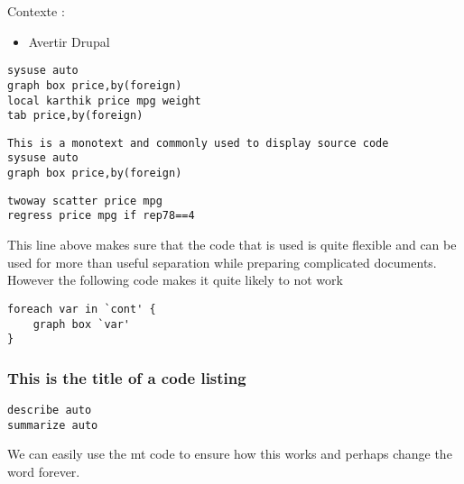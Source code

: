 \documentclass[color=usenames,dvipsnames]{beamer}
\begin{document}
\begin{frame}[fragile]
\begin{large}
    Contexte : \newline \pause
\end{large}

\begin{itemize}
    \item Avertir Drupal
\end{itemize}
\begin{lstlisting}
sysuse auto
graph box price,by(foreign)
local karthik price mpg weight
tab price,by(foreign)
\end{lstlisting}
\end{frame}
\begin{frame}
	\texttt{This is a monotext and commonly used to display source code\\
		    sysuse auto \\
		    graph box price,by(foreign)}
\end{frame}
\begin{frame}[fragile]
\begin{lstlisting}
twoway scatter price mpg
regress price mpg if rep78==4
\end{lstlisting} 
This line above makes sure that the code that is used is quite flexible and can be used for more than useful separation while preparing complicated documents. However the following code makes it quite likely to not work
\begin{lstlisting}
foreach var in `cont' {
    graph box `var'
}
\end{lstlisting}
\end{frame}
\begin{frame}[fragile] 
	\frametitle{This is the title of a code listing}
\begin{lstlisting}[frame=shadowbox, rulesepcolor=\color{gray}]
describe auto
summarize auto		
\end{lstlisting}
\bigskip
We can easily use the mt code to ensure how this works and perhaps change the word forever.
\end{frame}
\end{document}
